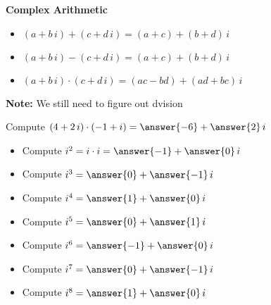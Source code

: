 \documentclass{ximera}
\begin{document}
\begin{definition}  \textbf{\textcolor{green!50!black}{Complex Arithmetic}} \\



\begin{itemize}
\item $ (a + b \, i) + (c + d \, i) = (a+c) + (b+d) \, i$
\item $ (a + b \, i) - (c + d \, i) = (a+c) + (b+d) \, i$
\item $ (a + b \, i) \cdot (c + d \, i) = (ac-bd) + (ad+bc) \, i$
\end{itemize}


\end{definition}









\textbf{Note:} We still need to figure out dvision






\begin{question}


Compute   $(4 + 2 \, i) \cdot (-1 + i) = \answer{-6} + \answer{2} \, i$

\end{question}





\begin{question}


\begin{itemize}
\item Compute   $i^2 = i \cdot i = \answer{-1} + \answer{0} \, i$
\item Compute   $i^3 =  \answer{0} + \answer{-1} \, i$
\item Compute   $i^4 =  \answer{1} + \answer{0} \, i$
\item Compute   $i^5 =  \answer{0} + \answer{1} \, i$
\item Compute   $i^6 =  \answer{-1} + \answer{0} \, i$
\item Compute   $i^7 =  \answer{0} + \answer{-1} \, i$
\item Compute   $i^8 =  \answer{1} + \answer{0} \, i$
\end{itemize}

\end{question}
\end{document}
